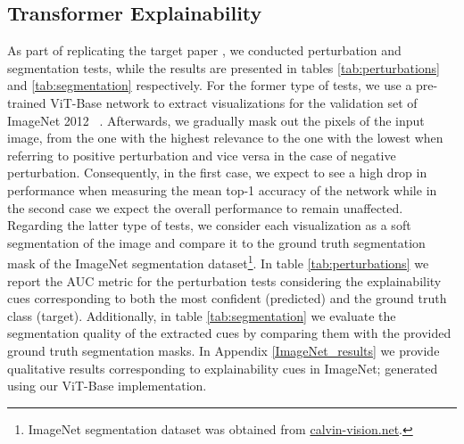 \documentclass{article}
\begin{document}
\subsection{Transformer Explainability}
As part of replicating the target paper \cite{mainpaper}, we conducted perturbation and segmentation tests, while the results are presented in tables \ref{tab:perturbations} and \ref{tab:segmentation} respectively. For the former type of tests, we use a pre-trained ViT-Base network to extract visualizations for the validation set of ImageNet 2012 ~\cite{russakovsky2015ImageNet}. Afterwards, we gradually mask out the pixels of the input image, from the one with the highest relevance to the one with the lowest when referring to positive perturbation and vice versa in the case of negative perturbation. Consequently, in the first case, we expect to see a high drop in performance when measuring the mean top-1 accuracy of the network while in the second case we expect the overall performance to remain unaffected. Regarding the latter type of tests, we consider each visualization as a soft segmentation of the image and compare it to the ground truth segmentation mask of the ImageNet segmentation dataset\footnote{ImageNet segmentation dataset was obtained from \href{http://calvin-vision.net/bigstuff/proj-imagenet/data/gtsegs_ijcv.mat}{calvin-vision.net}.}.  In 
table \ref{tab:perturbations} we report the AUC metric for the perturbation tests considering the explainability cues corresponding to both the most confident (predicted) and the ground truth class (target). Additionally, in table \ref{tab:segmentation} we evaluate the segmentation quality of the extracted cues by comparing them with the provided ground truth segmentation masks. In Appendix \ref{ImageNet_results} we provide qualitative results corresponding to explainability cues in ImageNet; generated using our ViT-Base implementation.
\end{document}
